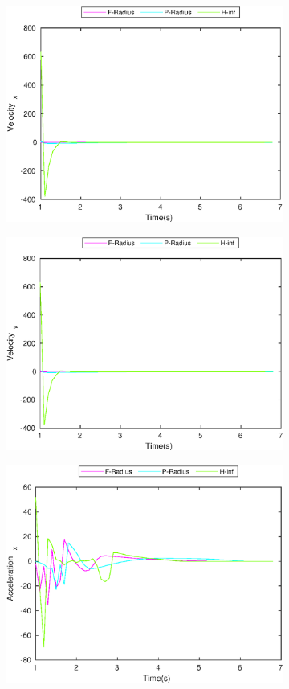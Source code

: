 \begin{figure}[!h]
\begin{subfigure}{.5\linewidth}
\includegraphics[width=.9\linewidth]{figures/BoundChange/PM/pm_bound_changeVelocity_x}
\end{subfigure}
\begin{subfigure}{.5\linewidth}
\centering
\includegraphics[width=.9\linewidth]{figures/BoundChange/PM/pm_bound_changeVelocity_y}
\end{subfigure}
\begin{subfigure}{.5\linewidth}
\centering
\includegraphics[width=.9\linewidth]{figures/BoundChange/PM/pm_bound_changeAcceleration_x}

\end{subfigure}
\end{figure}
